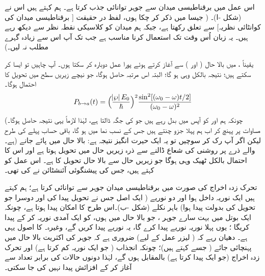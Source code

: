 اس عمل میں برقناطیسی میدان سے جوہر  توانائی جذب کرتا ہے۔ ہم کہتے ہیں اس نے   (شکل -ا)۔ (  جیسا میں ذکر کر چکا ہوں،  لفظ   در حقیقت [  برقناطیسی میدان کی کوانٹائی نظریہ]  سے تعلق رکھتا ہے،  جبکہ ہم میدان کو کلاسیکی نقطہ نظر سے دیکھ رہے ہیں۔ یہ زبان اُس وقت تک استعمال کرنا مناسب ہے جب تک آپ اس سے زیادہ گہرے  مطلب نہ لیں۔)

یقیناً ، میں بالا حال (  اور   )   سے آغاز کرتے ہوئے پورا عمل دوبارہ کر سکتا ہوں۔ آپ  چاہیں تو ایسا کر سکتے ہیں؛  نتیجہ  بالکل وہی ہو گا؛  البتہ اس
 مرتبہ   حاصل ہوگا،  جو نیچے  زیریں سطح  میں تحویل  کا احتمال ہوگا۔
\begin{align}\label{مساوات_تابع_مضطرب_تحویلی_احتمال_سعت}
	P_{b\to a} (t) = \Big(\frac{\abs{\wp}E_0}{\hslash}\Big)^2 \frac{\sin^2[(\omega_0 - \omega)t/2]}{(\omega_0 - \omega)^2}
\end{align}
(چونکہ ہم  اور   کو آپس میں بدل      رہے ہیں جو  کی جگہ  ڈالتا ہے،  لہٰذا لازماً یہی نتیجہ حاصل ہوگا۔ مساوات   پر  پہنچ کر اب  ہم پہلا جزو  چنتے ہیں جس کے نسب نما میں  ہو گا، باقی حساب پہلے کی طرح ہے۔) لیکن اگر آپ  رک کر سوچیں تو یہ  ایک  حیرت انگیز  نتیجہ ہے:  بالا حال میں پائے جانے والے ذرے پر روشنی کی شعاع ڈالنے سے ذرہ زیریں حال میں  تحویل  ہوتا ہے اور اس کا احتمال بالکل ٹھیک وہی ہوگا جو زیریں حال سے بالا حال تحویل  کا ہے۔ اس عمل کو   کہتے ہیں،  جس کی پیشنگوئی آئنشٹائن نے کی   تھی۔

تحرک زدہ اخراج کی صورت میں برقناطیسی میدان   جوہر سے    توانائی  کرتا ہے؛ ہم کہتے ہیں ایک نوریہ داخل ہوا اور دو نوریے (  ایک اصل جس نے تحویل  پیدا کی اور دوسرا جو تحویل کی بدولت پیدا  ہوا)  باہر نکلے   (شکل -ب)۔اس طرح     کا امکان پیدا ہوتا ہے،  چونکہ  ایک بوتل میں بہت سارے جوہر ، جو  بالا حال میں ہوں، کو ایک آمدی نوریہ   کر کے    پیدا کریگا ؛ یوں پہلا نوریہ  نوریے پیدا کرے گا، یہ نوریے  پیدا کریں گے، وغیرہ۔  کا   اصول   یہی    ہے۔   دھیان رہے کہ ( لیزر عمل کے لیے)  ضروری ہے کہ جوہر کی   اکثریت  بالا حال میں پہنچائی  جائے (  جسے    کہتے ہیں)؛   چونکہ انجذاب (  جو  ایک نوریہ کم کرتا ہے) اور تحرک زدہ  اخراج  (جو ایک پیدا کرتا ہے)  بالمقابل ہوں گے،  لہٰذا دونوں حالات کی برابر تعداد سے آغاز کر کے  افزائش  پیدا نہیں کی جا سکتی۔ 

